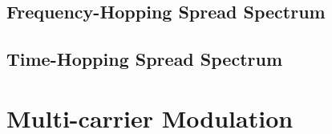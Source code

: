 \begin{refsection}

\subsection{Frequency-Hopping Spread Spectrum}

\subsection{Time-Hopping Spread Spectrum}

\section{Multi-carrier Modulation}


{}
\printbibliography[heading=subbibliography]
\end{refsection}

